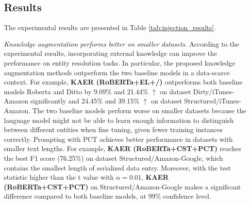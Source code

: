 \subsection{Results}
The experimental results are presented in Table \ref{tab:injection_results}.

\textit{Knowledge augmentation performs better on smaller datasets.}
According to the experimental results, incorporating external knowledge can improve the performance on entity resolution tasks. In particular, the proposed knowledge augmentation methods outperform the two baseline models in a data-scarce context.
For example, \textbf{KAER (RoBERTa+EL+/)} outperforms both baseline models Roberta and Ditto by 9.09\% and 21.44\% $\uparrow$ on dataset Dirty/iTunes-Amazon significantly and 24.45\% and 39.15\% $\uparrow$ on dataset Structured/iTunes-Amazon. The two baseline models perform worse on smaller datasets because the language model might not be able to learn enough information to distinguish between different entities when fine tuning, given fewer training instances correctly. 
Prompting with PCT achieves better performance in datasets with smaller text lengths. For example, \textbf{KAER (RoBERTa+CST+PCT)} reaches the best F1 score (76.25\%) on dataset Structured/Amazon-Google, which contains the smallest length of serialized data entry. Moreover, with the test statistic higher than the t value with $\alpha=0.01$, \textbf{KAER (RoBERTa+CST+PCT)} on Structured/Amazon-Google makes a significant difference compared to both baseline models, at 99\% confidence level.

